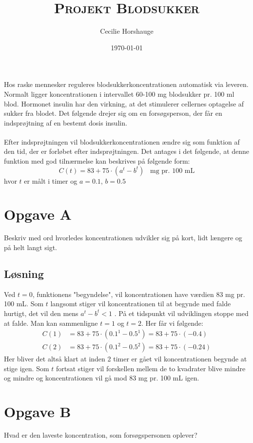 \documentclass[a4paper, 11pt]{article}
\title{{\large \textsc{Projekt Blodsukker}}}
\author{Cecilie Horshauge}
\date{\today}
\begin{document}
\maketitle
\noindent Hos raske mennesker reguleres blodsukkerkoncentrationen automatisk via leveren. 
Normalt ligger koncentrationen i intervallet 60-100 mg blodsukker pr. 100 ml blod. 
Hormonet insulin har den virkning, at det stimulerer cellernes optagelse af sukker fra blodet. 
Det følgende drejer sig om en forsøgsperson, der får en indsprøjtning af en bestemt dosis insulin.\\\\
Efter indsprøjtningen vil blodsukkerkoncentrationen ændre sig som funktion af den tid,
der er forløbet efter indsprøjtningen. Det antages i det følgende, at denne funktion med god tilnærmelse kan beskrives på følgende form: 
\[C(t)=83+75\cdot (a^t-b^t) \;\;\; \text{mg pr. 100 mL}\]
hvor \(t\) er målt i timer og \(a=0.1\), \(b=0.5\)

\section*{Opgave A} 
Beskriv med ord hvorledes koncentrationen udvikler sig på kort, lidt længere og på helt langt sigt.

\subsection*{Løsning}
Ved \(t=0\), funktionens "begyndelse", vil koncentrationen have værdien \(83\) mg pr. 100 mL. Som \(t\) langsomt stiger vil koncentrationen til at begynde med falde hurtigt, det vil den mens \(a^t-b^t < 1\) . På et tidspunkt vil udviklingen stoppe med at falde. Man kan sammenligne \(t=1\) og \(t=2\). Her får vi følgende:
\begin{align*}
    C(1)&=83+75 \cdot (0.1^1-0.5^1)=83+75 \cdot (-0.4)\\
    C(2)&=83+75 \cdot (0.1^2-0.5^2)=83+75 \cdot (-0.24)
\end{align*} 
Her bliver det altså klart at inden 2 timer er gået vil koncentrationen begynde at stige igen. Som \(t\) fortsat stiger vil forskellen mellem de to kvadrater blive mindre og mindre og koncentrationen vil gå mod 83 mg pr. 100 mL igen.
\clearpage
\section*{Opgave B} 
Hvad er den laveste koncentration, som forsøgspersonen oplever?
\end{document}
